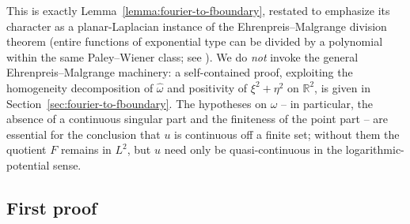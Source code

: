 \documentclass[a4paper,11pt,reqno]{amsart}
\numberwithin{equation}{section}
\theoremstyle{plain} %
\theoremstyle{definition} %
\theoremstyle{remark}
\newcommand{\R}{\mathbb{R}}
\begin{document}
This is exactly Lemma~\ref{lemma:fourier-to-fboundary}, restated to
emphasize its character as a planar-Laplacian instance of the
Ehrenpreis--Malgrange division theorem (entire functions of exponential
type can be divided by a polynomial within the same Paley--Wiener class;
see \cite[Ch.~7]{Hormander}). We do \emph{not} invoke the general
Ehrenpreis--Malgrange machinery: a self-contained proof, exploiting the
homogeneity decomposition of $\widehat\omega$ and positivity of
$\xi^2+\eta^2$ on $\R^2$, is given in Section~\ref{sec:fourier-to-fboundary}.
The hypotheses on $\omega$ -- in particular, the absence of a continuous
singular part and the finiteness of the point part -- are essential for
the conclusion that $u$ is continuous off a finite set; without them the
quotient $F$ remains in $L^2$, but $u$ need only be quasi-continuous in
the logarithmic-potential sense.

\subsection{First proof}
\end{document}
